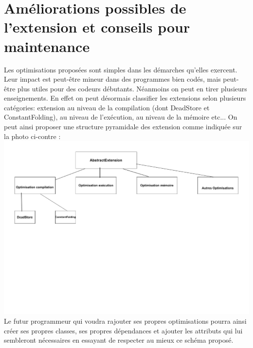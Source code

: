 \documentclass[a4paper]{article}
\begin{document}
\section{Améliorations possibles de l'extension et conseils pour maintenance}
Les optimisations proposées sont simples dans les démarches qu'elles exercent. Leur impact est peut-être mineur dans des programmes bien codés, mais peut-être plus utiles pour des codeurs débutants. Néanmoins on peut en tirer plusieurs enseignements.
En effet on peut désormais classifier les extensions selon plusieurs catégories: extension au niveau de la compilation (dont DeadStore et ConstantFolding), au niveau de l'exécution, au niveau de la mémoire etc...
On peut ainsi proposer une structure pyramidale des extension comme indiquée sur la photo ci-contre :\\
\includegraphics[scale=0.5]{UML.pdf}\\
Le futur programmeur qui voudra rajouter ses propres optimisations pourra ainsi créer ses propres classes, ses propres dépendances et ajouter les attributs qui lui sembleront nécessaires en essayant de respecter au mieux ce schéma proposé.
\end{document}
